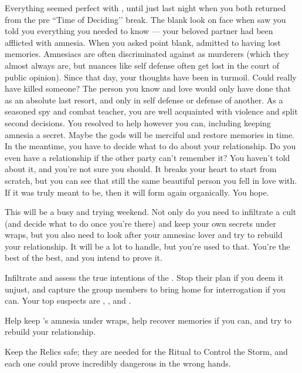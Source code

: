 \documentclass[char]{GL2020}
\begin{document}
Everything seemed perfect with \cLibrarian{}, until just last night when you both returned from the pre ``Time of Deciding’’ break. The blank look on \cLibrarian{\their} face when \cLibrarian{\they} saw you told you everything you needed to know — your beloved partner had been afflicted with amnesia. When you asked \cLibrarian{\them} point blank, \cLibrarian{\they} admitted to having lost \cLibrarian{\their} memories. Amnesiacs are often discriminated against as murderers (which they almost always are, but nuances like self defense often get lost in the court of public opinion). Since that day, your thoughts have been in turmoil. Could \cLibrarian{} really have killed someone? The person you know and love would only have done that as an absolute last resort, and only in self defense or defense of another. As a seasoned spy and combat teacher, you are well acquainted with violence and split second decisions. You resolved to help \cLibrarian{} however you can, including keeping \cLibrarian{\their} amnesia a secret. Maybe the gods will be merciful and restore \cLibrarian{\their} memories in time. In the meantime, you have to decide what to do about your relationship. Do you even have a relationship if the other party can't remember it? You haven't told \cLibrarian{\them} about it, and you're not sure you should. It breaks your heart to start from scratch, but you can see that \cLibrarian{\theyare} still the same beautiful person you fell in love with. If it was truly meant to be, then it will form again organically. You hope.  

This will be a busy and trying weekend. Not only do you need to infiltrate a cult (and decide what to do once you're there) and keep your own secrets under wraps, but you also need to look after your amnesiac lover and try to rebuild your relationship. It will be a lot to handle, but you're used to that. You're the best of the best, and you intend to prove it.

\begin{itemz}
    \item Infiltrate and assess the true intentions of the \pGoaties{}. Stop their plan if you deem it unjust, and capture the group members to bring home for interrogation if you can. Your top suspects are \cChupInventor{}, \cHistory{}, and \cPirate{}.
    \item Help keep \cLibrarian{}'s amnesia under wraps, help \cLibrarian{\them} recover \cLibrarian{\their} memories if you can, and try to rebuild your relationship.
    \item Keep the Relics safe; they are needed for the Ritual to Control the Storm, and each one could prove incredibly dangerous in the wrong hands.
\end{itemz}
\end{document}
